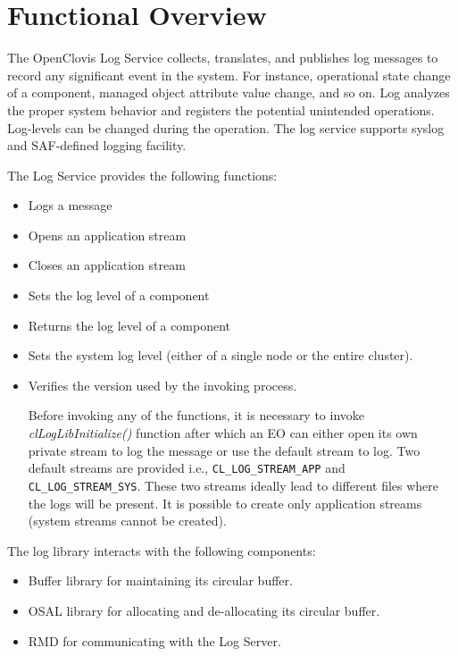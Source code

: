 \hypertarget{group__group26}{\chapter{Functional Overview}\label{group__group26}}


The Open\-Clovis Log Service collects, translates, and publishes log messages to record any significant event in the system. For instance, operational state change of a component, managed object attribute value change, and so on. Log analyzes the proper system behavior and registers the potential unintended operations. Log-levels can be changed during the operation. The log service supports syslog and SAF-defined logging facility. \par
 \par
 The Log Service provides the following functions: \begin{itemize}
\item Logs a message \item Opens an application stream \item Closes an application stream \item Sets the log level of a component \item Returns the log level of a component \item Sets the system log level (either of a single node or the entire cluster). \item Verifies the version used by the invoking process. \par
 \par
 Before invoking any of the functions, it is necessary to invoke \textit{clLogLibInitialize()} function after which an EO can either open its own private stream to log the message or use the default stream to log. Two default streams are provided i.e., {\tt CL\_\-LOG\_\-STREAM\_\-APP} and {\tt CL\_\-LOG\_\-STREAM\_\-SYS}. These two streams ideally lead to different files where the logs will be present. It is possible to create only application streams (system streams cannot be created).\end{itemize}
\par
The log library interacts with the following components: \begin{itemize}
\item Buffer library for maintaining its circular buffer. 
\item OSAL library for allocating and de-allocating its circular buffer. 
\item RMD for communicating with the Log Server.\end{itemize}

